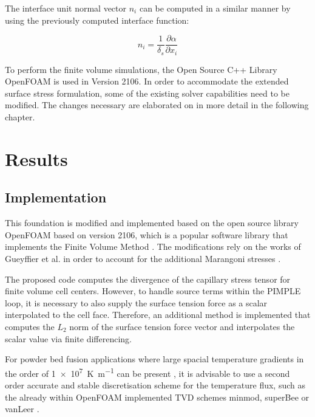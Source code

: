 \documentclass[conference,final]{IEEEtran}
\begin{document}
The interface unit normal vector $n_i$ can be computed in a similar manner by using the previously computed interface function:

\begin{equation}
    n_i = \frac{1}{\delta_s} \frac{\partial \alpha}{\partial x_i}
\end{equation}

To perform the finite volume simulations, the Open Source C++ Library OpenFOAM is used in Version 2106. In order to accommodate the extended surface stress formulation, some of the existing solver capabilities need to be modified. The changes necessary are elaborated on in more detail in the following chapter.

\section{Results}

\subsection{Implementation}

This foundation is modified and implemented based on the open source library OpenFOAM based on version 2106, which is a popular software library that implements the Finite Volume Method \cite{jasakOpenFOAMLibraryComplex2007}. The modifications rely on the works of Gueyffier et al. in order to account for the additional Marangoni stresses \cite{gueyffierVolumeofFluidInterfaceTracking1999}.

The proposed code computes the divergence of the capillary stress tensor for finite volume cell centers. However, to handle source terms within the PIMPLE loop, it is necessary to also supply the surface tension force as a scalar interpolated to the cell face. Therefore, an additional method is implemented that computes the $L_2$ norm of the surface tension force vector and interpolates the scalar value via finite differencing.

For powder bed fusion applications where large spacial temperature gradients in the order of \SI[per-mode=fraction]{1e7}{\kelvin \per \metre} can be present \cite{hooperMeltPoolTemperature2018}, it is advisable to use a second order accurate and stable discretisation scheme for the temperature flux, such as the already within OpenFOAM implemented TVD schemes minmod, superBee or vanLeer \cite{roeCharacteristicBasedSchemesEuler1986,vanleerUltimateConservativeDifference1974}.
\end{document}
